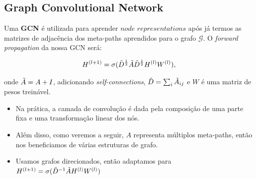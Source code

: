 \documentclass[12pt,notheorems,hyperref={pdfauthor=whatever}]{beamer}
\begin{document}
\subsection{Graph Convolutional Network}

\begin{frame}
    Uma \textbf{GCN} é utilizada para aprender $\textit{node representations}$ após já termos as matrizes de adjacência dos meta-paths aprendidos para o grafo $\mathcal{G}$. O \textit{forward propagation} da nossa GCN será:

    $$H^{(l+1)} = \sigma(\Tilde{D}^{\frac{1}{2}} \Tilde{A}\Tilde{D}^{\frac{1}{2}}H^{(l)}W^{(l)}),$$

    onde $\Tilde{A}=A+I$, adicionando \textit{self-connections}, $\Tilde{D}= \sum_i \Tilde{A}_{ij}$ e $W$ é uma matriz de pesos treinável.

    \vspace{15pt}

    \begin{itemize}
        \item Na prática, a camada de convolução é dada pela composição de uma parte fixa e uma transformação linear dos nós.
        \item Além disso, como veremos a seguir, $A$ representa múltiplos meta-paths, então nos beneficiamos de várias estruturas de grafo.
        \item Usamos grafos direcionados, então adaptamos para $H^{(l+1)} = \sigma(\Tilde{D}^{-1} \Tilde{A}H^{(l)}W^{(l)})$
    \end{itemize}
\end{frame}



\end{document}
